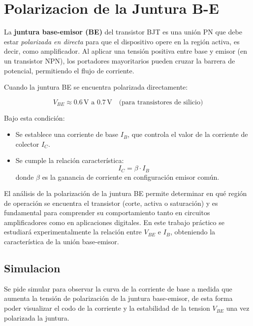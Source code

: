 \chapter{Polarizacion de la Juntura B-E}
    La \textbf{juntura base-emisor (BE)} del transistor BJT es una unión PN que debe estar \textit{polarizada en directa} para que el dispositivo opere en la región activa, es decir, como amplificador. Al aplicar una tensión positiva entre base y emisor (en un transistor NPN), los portadores mayoritarios pueden cruzar la barrera de potencial, permitiendo el flujo de corriente.
    
    Cuando la juntura BE se encuentra polarizada directamente:
    
    \[
    V_{BE} \approx 0.6\,\text{V} \text{ a } 0.7\,\text{V} \quad \text{(para transistores de silicio)}
    \]
    
    Bajo esta condición:
    \begin{itemize}
        \item Se establece una corriente de base $I_B$, que controla el valor de la corriente de colector $I_C$.
        \item Se cumple la relación característica:
        \[
        I_C = \beta \cdot I_B
        \]
        donde $\beta$ es la ganancia de corriente en configuración emisor común.
    \end{itemize}
    
    El análisis de la polarización de la juntura BE permite determinar en qué región de operación se encuentra el transistor (corte, activa o saturación) y es fundamental para comprender su comportamiento tanto en circuitos amplificadores como en aplicaciones digitales. En este trabajo práctico se estudiará experimentalmente la relación entre $V_{BE}$ e $I_B$, obteniendo la característica de la unión base-emisor.

\newpage

  \section{Simulacion}

    Se pide simular para observar la curva de la corriente de base a medida que aumenta la tensión de polarización de la juntura base-emisor, de esta forma poder visualizar el codo de la corriente y la estabilidad de la tension $V_{BE}$ una vez polarizada la juntura.

    

